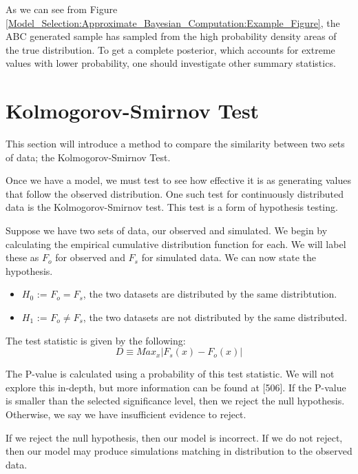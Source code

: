 \begin{example}
    As we can see from Figure \ref{Model_Selection:Approximate_Bayesian_Computation:Example_Figure}, the ABC generated sample has sampled from the high probability density areas of the true distribution. To get a complete posterior, which accounts for extreme values with lower probability, one should investigate other summary statistics.
\end{example}




\section{Kolmogorov-Smirnov Test}
\label{Model_Selection:Kolmogorov_Smirnov_Test}

This section will introduce a method to compare the similarity between two sets of data; the Kolmogorov-Smirnov Test.

Once we have a model, we must test to see how effective it is as generating values that follow the observed distribution. One such test for continuously distributed data is the Kolmogorov-Smirnov test. This test is a form of hypothesis testing. 

Suppose we have two sets of data, our observed and simulated. We begin by calculating the empirical cumulative distribution function for each. We will label these as $F_o$ for observed and $F_s$ for simulated data. We can now state the hypothesis.

\begin{itemize}
    \item $H_0$ := $F_o = F_s$, the two datasets are distributed by the same distribtution.
    \item $H_1$ := $F_o \neq F_s$, the two datasets are not distributed by the same distributed. 
\end{itemize}

The test statistic is given by the following:
\begin{equation}
    D \equiv Max_x |F_s(x) - F_o(x)|
\end{equation}

The P-value is calculated using a probability of this test statistic. We will not explore this in-depth, but more information can be found at \cite{Ross2004}[506]. If the P-value is smaller than the selected significance level, then we reject the null hypothesis. Otherwise, we say we have insufficient evidence to reject. 

If we reject the null hypothesis, then our model is incorrect. If we do not reject, then our model may produce simulations matching in distribution to the observed data.

